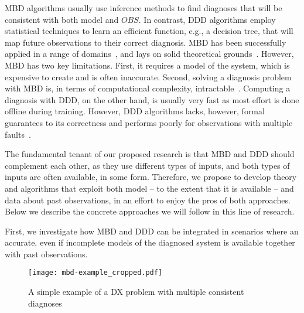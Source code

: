 \documentclass[12pt]{article}
\begin{document}
MBD algorithms usually use inference methods to find diagnoses that will be consistent with both model and $OBS$. In contrast, DDD algorithms employ statistical techniques to learn an efficient function, e.g., a decision tree, that will map future observations to their correct diagnosis. 
MBD has been successfully applied in a range of domains~\cite{williams96,struss2003model,wotawa2002model}, and lays on solid theoretical grounds~\cite{de1987diagnosing,reiter1987theory}. However, MBD has two key limitations. First, it requires a model of the system, which is expensive to create and is often inaccurate. Second, solving a diagnosis problem with MBD is, in terms of computational complexity, intractable~\cite{bylander1991computational}. Computing a diagnosis with DDD, on the other hand, is usually very fast as most effort is done offline during training. However, DDD algorithms lacks, however, formal guarantees to its correctness and performs poorly for observations with multiple faults~\cite{keren2011model}. 



The fundamental tenant of our proposed research is that MBD and DDD should complement each other, as they use different types of inputs, and both types of inputs are often available, in some form. Therefore, we propose to develop theory and algorithms that exploit both model -- to the extent that it is available -- and data about past observations, in an effort to enjoy the pros of both approaches. Below we describe the concrete approaches we will follow in this line of research.

First, we investigate how MBD and DDD can be integrated in scenarios where an accurate, even if incomplete models of the diagnosed system is available together with past observations. 


\begin{figure}
    \centering
	\texttt{[image: mbd-example\_cropped.pdf]}
    \caption{A simple example of a DX problem with multiple consistent diagnoses}
    \label{fig:mbd-example}
\end{figure}

\end{document}
